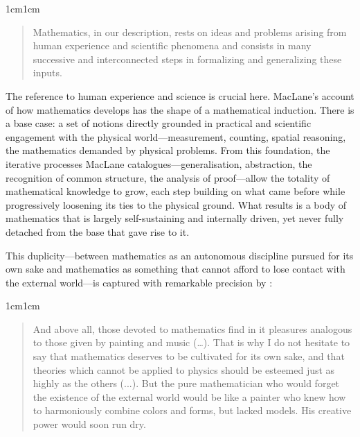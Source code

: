 \documentclass[11pt,a4paper]{book}
\theoremstyle{plain}
\begin{document}
\begin{adjustwidth}{1cm}{1cm}
\small
\begin{quote}
Mathematics, in our description, rests on ideas and problems arising from human experience and scientific phenomena and consists in many successive and interconnected steps in formalizing and generalizing these inputs. \parencite[449]{maclane1986mathematics}
\end{quote}
\end{adjustwidth}

The reference to human experience and science is crucial here. MacLane's account of how mathematics develops has the shape of a mathematical induction. There is a base case: a set of notions directly grounded in practical and scientific engagement with the physical world---measurement, counting, spatial reasoning, the mathematics demanded by physical problems. From this foundation, the iterative processes MacLane catalogues---generalisation, abstraction, the recognition of common structure, the analysis of proof---allow the totality of mathematical knowledge to grow, each step building on what came before while progressively loosening its ties to the physical ground. What results is a body of mathematics that is largely self-sustaining and internally driven, yet never fully detached from the base that gave rise to it.

This duplicity---between mathematics as an autonomous discipline pursued for its own sake and mathematics as something that cannot afford to lose contact with the external world---is captured with remarkable precision by \textcite[pp. 332--337]{Poincare1897rapports}:

\begin{adjustwidth}{1cm}{1cm}
\small
\begin{quote}
And above all, those devoted to mathematics find in it pleasures analogous to those given by painting and music (\dots). That is why I do not hesitate to say that mathematics deserves to be cultivated for its own sake, and that theories which cannot be applied to physics should be esteemed just as highly as the others (...). But the pure mathematician who would forget the existence of the external world would be like a painter who knew how to harmoniously combine colors and forms, but lacked models. His creative power would soon run dry. 
\end{quote}
\end{adjustwidth}
\end{document}

